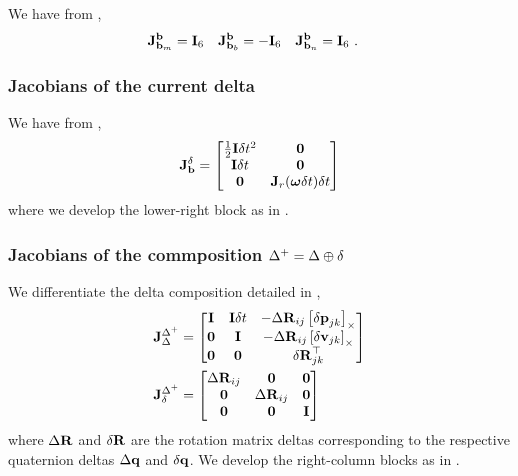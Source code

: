 We have from ,%
%
\begin{align}
{{\bf J}^{{\bf b}}_{{\bf b}_m}}&={\bf I}_6 & {{\bf J}^{{\bf b}}_{{\bf b}_b}}&=-{\bf I}_6 & {{\bf J}^{{\bf b}}_{{\bf b}_n}}&={\bf I}_6
~.
\end{align}

\subsubsection{Jacobians of the current delta}
\label{sec:jac_data}

We have from ,%
%
\begin{align}\label{equ:jacobian_current_delta}
{{\bf J}^{\delta}_{{\bf b}}} =
\begin{bmatrix}
\frac12{\bf I}\delta t^2 	& \bf0 \\
{\bf I}\delta t 			& \bf0 \\
\bf0 	          & {\bf J}_r({{\bm \omega}}\delta t)\delta t
\end{bmatrix}
\end{align}
%
where we develop the lower-right block as in .
%




\subsubsection{Jacobians of the commposition $\Delta^+=\Delta\oplus\delta$}

We differentiate the delta composition  detailed in ,
%
\begin{align}
\begin{split}
{{\bf J}^{\Delta^+}_{\Delta}} &= \begin{bmatrix}
{\bf I}  & {\bf I}\delta t & - {\Delta{\bf R}}_{ij}  \left[{\delta{\bf p}}_{jk}\right]_\times  \\
\bf0  & {\bf I}    & - {\Delta{\bf R}}_{ij}  \left[{\delta{\bf v}}_{jk}\right]_\times \\
\bf0  & \bf0    &   {\delta{\bf R}}_{jk}^{\top} 
\end{bmatrix} \\
{{\bf J}^{\Delta^+}_{\delta}} &= \begin{bmatrix}
{\Delta{\bf R}}_{ij} & \bf0     & \bf0 \\
\bf0     & {\Delta{\bf R}}_{ij} & \bf0 \\
\bf0     & \bf0     & {\bf I}  
\end{bmatrix}
\end{split}
\end{align}
%
where ${\Delta{\bf R}}$ and ${\delta{\bf R}}$ are the rotation matrix deltas corresponding to the respective quaternion deltas ${\Delta{\bf q}}$ and ${\delta{\bf q}}$. 
We develop the right-column blocks as in .


